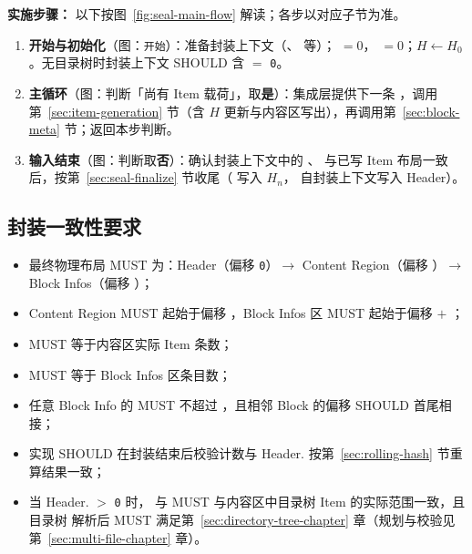 \textbf{实施步骤：}
以下按图~\ref{fig:seal-main-flow} 解读；各步以对应子节为准。
\begin{enumerate}
  \item \textbf{开始与初始化}（图：\texttt{开始}）：准备封装上下文（、 等）； $= 0$， $= 0$；$H \leftarrow H_0$。无目录树时封装上下文 SHOULD 含  $=$ \texttt{0}。
  \item \textbf{主循环}（图：判断「尚有 Item 载荷」，取\textbf{是}）：集成层提供下一条 ，调用第~\ref{sec:item-generation} 节（含 $H$ 更新与内容区写出），再调用第~\ref{sec:block-meta} 节；返回本步判断。
  \item \textbf{输入结束}（图：判断取\textbf{否}）：确认封装上下文中的 、 与已写 Item 布局一致后，按第~\ref{sec:seal-finalize} 节收尾（ 写入 $H_n$， 自封装上下文写入 Header）。
\end{enumerate}

\subsection{封装一致性要求}\label{sec:seal-consistency}
\begin{itemize}
  \item 最终物理布局 MUST 为：Header（偏移 \texttt{0}）$\rightarrow$ Content Region（偏移 ）$\rightarrow$ Block Infos（偏移 ）；
  \item Content Region MUST 起始于偏移 ，Block Infos 区 MUST 起始于偏移  $+$ ；
  \item {} MUST 等于内容区实际 Item 条数；
  \item {} MUST 等于 Block Infos 区条目数；
  \item 任意 Block Info 的  MUST 不超过 ，且相邻 Block 的偏移 SHOULD 首尾相接；
  \item 实现 SHOULD 在封装结束后校验计数与 Header. 按第~\ref{sec:rolling-hash} 节重算结果一致；
  \item 当 Header. $>$ \texttt{0} 时， 与  MUST 与内容区中目录树 Item 的实际范围一致，且目录树  解析后 MUST 满足第~\ref{sec:directory-tree-chapter} 章（规划与校验见第~\ref{sec:multi-file-chapter} 章）。
\end{itemize}

